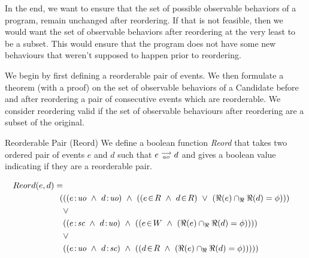     In the end, we want to ensure that the set of possible observable behaviors of a program, remain unchanged after reordering. If that is not feasible, then we would want the set of observable behaviors after reordering at the very least to be a subset. This would ensure that the program does not have some new behaviours that weren't supposed to happen prior to reordering. 
    
    We begin by first defining a reorderable pair of events. We then formulate a theorem (with a proof) on the set of observable behaviors of a Candidate before and after reordering a pair of consecutive events which are reorderable. We consider reordering valid if the set of observable behaviours after reordering are a subset of the original. 

    \begin{definition}{Reorderable Pair (Reord)}
        We define a boolean function \emph{Reord} that takes two ordered pair of events $e$ and $d$ such that $e\stackrel{\longrightarrow}{_{ao}}d$ and gives a boolean value indicating if they are a reorderable pair. 
        
        \begin{align*}
            Reord(e,d) = \\
            (
            &((\et{e}{uo} \ \wedge \ \et{d}{uo}) \ \wedge \ 
                    (   
                        (\event{e}{R} \ \wedge \ \event{d}{R}) \ \vee \ 
                        (\Re(e) \cap_\Re \Re(d) = \phi) 
                    )
            ) \\ &\vee \\
            &((\et{e}{sc} \ \wedge \ \et{d}{uo}) \ \wedge \ 
                    (
                        (\event{e}{W} \ \wedge \ (\Re(e) \cap_\Re \Re(d) = \phi)) 
                    )
            ) \\ &\vee \\
            &((\et{e}{uo} \ \wedge \ \et{d}{sc}) \ \wedge \ 
                    (
                        (\event{d}{R} \ \wedge \ (\Re(e) \cap_\Re \Re(d) = \phi)) 
                    )
            )
            )
        \end{align*}


         
    \end{definition}





    
\subsection{}

    

    
    
    
    
    